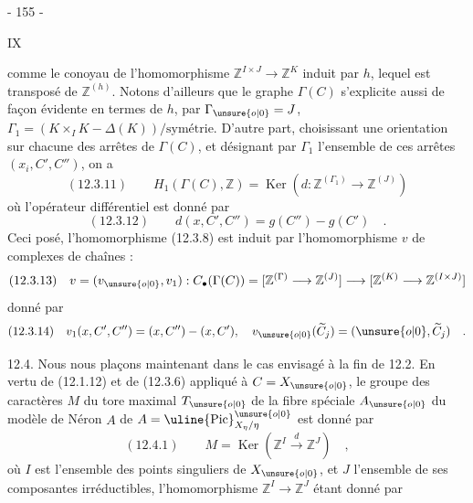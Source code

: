 
\begin{center}- 155 -\end{center}
\begin{flushright}IX\end{flushright}

comme le conoyau de l'homomorphisme $\mathbb Z^{I\times J}\longrightarrow\mathbb Z^K$ induit par $h$, lequel est transposé de $\mathbb Z^{(h)}$. Notons d'ailleurs que le graphe $\Gamma(C)$ s'explicite aussi de façon évidente en termes de $h$, par $\Gamma_{\unsure{o|0}}=J$, $\Gamma_1=(K\times_I K-\Delta(K))/\text{symétrie}$. D'autre part, choisissant une orientation sur chacune des arrêtes de $\Gamma(C)$, et désignant par $\Gamma_1$ l'ensemble de ces arrêtes $(x_i,C',C'')$, on a
\[
(12.3.11)\qquad
H_1(\Gamma(C),\mathbb Z)=\operatorname{Ker}(d:\mathbb Z^{(\Gamma_1)}\longrightarrow\mathbb Z^{(J)})
\]
où l'opérateur différentiel est donné par
\[
(12.3.12)\qquad d(x,C',C'')=g(C'')-g(C')\quad.
\]
Ceci posé, l'homomorphisme (12.3.8) est induit par l'homomorphisme $v$ de complexes de chaînes :
\[
(12.3.13)\quad
v=(v_{\unsure{o|0}},v_1):C_{\bullet}(\Gamma(C))
=[\mathbb Z^{(\Gamma)}\longrightarrow\mathbb Z^{(J)}]
\longrightarrow[\mathbb Z^{(K)}\longrightarrow\mathbb Z^{(I\times J)}]
\]
donné par
\[
(12.3.14)\quad
v_1(x,C',C'')=(x,C'')-(x,C'),\quad
v_{\unsure{o|0}}(\widetilde C_j)=(\unsure{o|0},\widetilde C_j)\quad.
\]

12.4. Nous nous plaçons maintenant dans le cas envisagé à la fin de 12.2. En vertu de (12.1.12) et de (12.3.6) appliqué à $C=X_{\unsure{o|0}}$, le groupe des caractères $M$ du tore maximal $T_{\unsure{o|0}}$ de la fibre spéciale $A_{\unsure{o|0}}$ du modèle de Néron $A$ de $A=\uline{\operatorname{Pic}}^{\unsure{o|0}}_{X_\eta/\eta}$ est donné par
\[
(12.4.1)\qquad M=\operatorname{Ker}(\mathbb Z^I\xrightarrow{d}\mathbb Z^J)\quad,
\]
où $I$ est l'ensemble des points singuliers de $X_{\unsure{o|0}}$, et $J$ l'ensemble de ses composantes irréductibles, l'homomorphisme $\mathbb Z^I\longrightarrow\mathbb Z^J$ étant donné par

